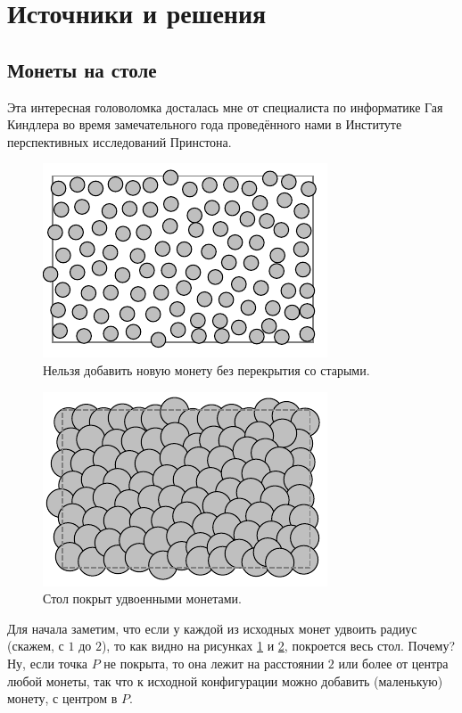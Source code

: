 \section*{Источники и решения}

\subsection*{Монеты на столе}

Эта интересная головоломка досталась мне от специалиста по информатике Гая Киндлера во время замечательного года проведённого нами в Институте перспективных исследований Принстона.

\begin{figure}[t!]
\centering
\includegraphics[scale=1]{pics/coin1}
\caption{Нельзя добавить новую монету без перекрытия со старыми.}
\label{pic:coin1}
\end{figure}

\begin{figure}[b!]
\centering
\includegraphics[scale=1]{pics/coin2}
\caption{Стол покрыт удвоенными монетами.}
\label{pic:coin2}
\end{figure}

Для начала заметим, что если у каждой из исходных монет удвоить радиус (скажем, с $1$ до $2$), то как видно на рисунках \ref{pic:coin1} и \ref{pic:coin2}, покроется весь стол.
Почему?
Ну, если точка $P$ не покрыта, то она лежит на расстоянии $2$ или более от центра любой монеты, так что  к исходной конфигурации можно добавить (маленькую) монету, с центром в $P$.

